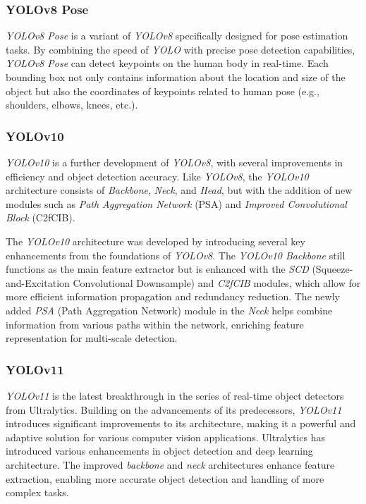 \subsubsection{YOLOv8 Pose}
\label{subsubsec: YOLOv8 Pose}

\emph{YOLOv8 Pose} is a variant of \emph{YOLOv8} specifically designed for pose estimation tasks. By combining the speed of \emph{YOLO} with precise pose detection capabilities, \emph{YOLOv8 Pose} can detect keypoints on the human body in real-time. Each bounding box not only contains information about the location and size of the object but also the coordinates of keypoints related to human pose (e.g., shoulders, elbows, knees, etc.).

\subsubsection{YOLOv10}
\label{subsubsec:YOLOv10}

\emph{YOLOv10} is a further development of \emph{YOLOv8}, with several improvements in efficiency and object detection accuracy. Like \emph{YOLOv8}, the \emph{YOLOv10} architecture consists of \emph{Backbone}, \emph{Neck}, and \emph{Head}, but with the addition of new modules such as \emph{Path Aggregation Network} (PSA) and \emph{Improved Convolutional Block} (C2fCIB).

The \emph{YOLOv10} architecture was developed by introducing several key enhancements from the foundations of \emph{YOLOv8}. The \emph{YOLOv10 Backbone} still functions as the main feature extractor but is enhanced with the \emph{SCD} (Squeeze-and-Excitation Convolutional Downsample) and \emph{C2fCIB} modules, which allow for more efficient information propagation and redundancy reduction. The newly added \emph{PSA} (Path Aggregation Network) module in the \emph{Neck} helps combine information from various paths within the network, enriching feature representation for multi-scale detection.

\subsubsection{YOLOv11}
\label{subsubsec:YOLOv11}

\emph{YOLOv11} is the latest breakthrough in the series of real-time object detectors from Ultralytics. Building on the advancements of its predecessors, \emph{YOLOv11} introduces significant improvements to its architecture, making it a powerful and adaptive solution for various computer vision applications. Ultralytics has introduced various enhancements in object detection and deep learning architecture. The improved \emph{backbone} and \emph{neck} architectures enhance feature extraction, enabling more accurate object detection and handling of more complex tasks.

